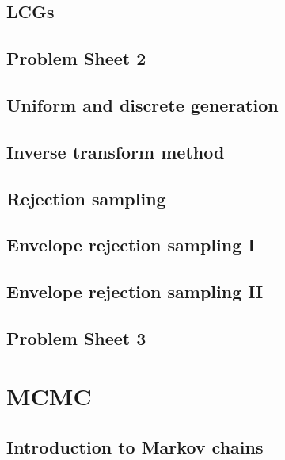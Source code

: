 \documentclass[
  letterpaper,
  DIV=11,
  numbers=noendperiod]{scrreprt}
\theoremstyle{definition}
\theoremstyle{definition}
\theoremstyle{remark}
\begin{document}
\chapter{LCGs}\label{lcgs}

\chapter*{Problem Sheet 2}\label{problem-sheet-2}


\chapter{Uniform and discrete
generation}\label{uniform-and-discrete-generation}

\chapter{Inverse transform method}\label{inverse-transform-method}

\chapter{Rejection sampling}\label{rejection-sampling}

\chapter{Envelope rejection sampling
I}\label{envelope-rejection-sampling-i}

\chapter{Envelope rejection sampling
II}\label{envelope-rejection-sampling-ii}

\chapter*{Problem Sheet 3}\label{problem-sheet-3}


\part{MCMC}

\chapter{Introduction to Markov
chains}\label{introduction-to-markov-chains}
\end{document}

